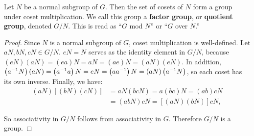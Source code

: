 \begin{theorem}
Let $N$ be a normal subgroup of $G$. Then the set of cosets of $N$ form a group under coset multiplication. We call this group a \textbf{factor group}, or \textbf{quotient group}, denoted $G/N$. This is read as ``$G$ mod $N$'' or ``$G$ over $N$.''
\end{theorem}

\begin{proof}
Since $N$ is a normal subgroup of $G$, coset multiplication is well-defined. Let $aN, bN, cN \in G/N$. $eN = N$ serves as the identity element in $G/N$, because $(eN)(aN) = (ea)N = aN = (ae)N = (aN)(eN)$. In addition, $\left(a^{-1} N\right)(aN) = \left(a^{-1} a\right)N = eN = \left(a a^{-1}\right)N = (aN)\left(a^{-1} N\right)$, so each coset has its own inverse. Finally, we have:
\begin{align*}
    (aN)\left[(bN)(cN)\right] &= aN(bcN) = a(bc)N = (ab)cN \\
    &= (abN)cN = \left[(aN)(bN)\right]cN,
\end{align*}

So associativity in $G/N$ follows from associativity in $G$. Therefore $G/N$ is a group.

\end{proof}